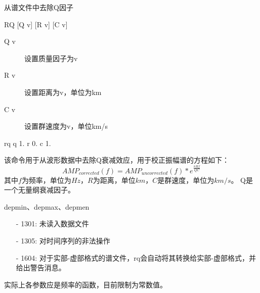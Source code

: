 \label{cmd:rq}

从谱文件中去除Q因子

\begin{SACSTX}
RQ [Q v] [R v] [C v]
\end{SACSTX}

\begin{description}
\item [Q v] 设置质量因子为v 
\item [R v] 设置距离为v，单位为km 
\item [C v] 设置群速度为v，单位km/s 
\end{description}

\begin{SACDFT}
rq q 1. r 0. c 1.
\end{SACDFT}

该命令用于从波形数据中去除Q衰减效应，用于校正振幅谱的方程如下：
\[ AMP_{corrected}(f) = AMP_{uncorrected}(f) * e^{\frac{\pi R f}{Q C}} \]
其中$f$为频率，单位为$Hz$，$R$为距离，单位$km$，$C$是群速度，单位为$km/s$。
Q是一个无量纲衰减因子。

depmin、depmax、depmen

\begin{itemize}
\item[-]1301: 未读入数据文件
\item[-]1305: 对时间序列的非法操作
\end{itemize}

\begin{itemize}
\item[-]1604: 对于实部-虚部格式的谱文件，rq会自动将其转换给实部-虚部格式，并给出警告消息。
\end{itemize}

实际上各参数应是频率的函数，目前限制为常数值。
